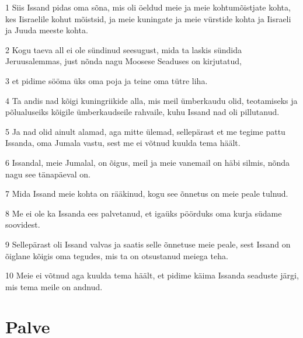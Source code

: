 \par 1 Siis Issand pidas oma sõna, mis oli öeldud meie ja meie  kohtumõistjate kohta, kes Iisraelile kohut mõistsid, ja meie kuningate ja meie vürstide kohta ja Iisraeli ja Juuda meeste kohta.
\par 2 Kogu taeva all ei ole sündinud seesugust, mida ta laskis sündida Jeruusalemmas, just nõnda nagu Moosese Seaduses on kirjutatud,
\par 3 et pidime sööma üks oma poja ja teine oma tütre liha.
\par 4 Ta andis nad kõigi kuningriikide alla, mis meil ümberkaudu olid, teotamiseks ja põlualuseiks kõigile ümberkaudseile rahvaile, kuhu Issand nad oli pillutanud.
\par 5 Ja nad olid ainult alamad, aga mitte ülemad, sellepärast et me tegime pattu Issanda, oma Jumala vastu, sest me ei võtnud kuulda tema häält.
\par 6 Issandal, meie Jumalal, on õigus, meil ja meie vanemail on häbi silmis, nõnda nagu see tänapäeval on.
\par 7 Mida Issand meie kohta on rääkinud, kogu see õnnetus on meie peale tulnud.
\par 8 Me ei ole ka Issanda ees palvetanud, et igaüks pöörduks oma kurja südame soovidest.
\par 9 Sellepärast oli Issand valvas ja saatis selle õnnetuse meie peale, sest Issand on õiglane kõigis oma tegudes, mis ta on otsustanud meiega teha.
\par 10 Meie ei võtnud aga kuulda tema häält, et pidime käima Issanda seaduste järgi, mis tema meile on andnud.

\section*{Palve}

